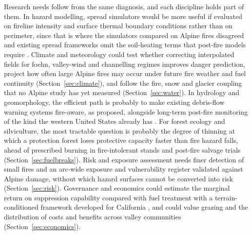 \documentclass[11pt,a4paper]{article}
\begin{document}
Research needs follow from the same diagnosis, and each discipline holds part of them. In hazard modelling, spread simulators would be more useful if evaluated on fireline intensity and surface thermal boundary conditions rather than on perimeter, since that is where the simulators compared on Alpine fires disagreed \citep{malanchini_modeling_2025} and existing spread frameworks omit the soil-heating terms that post-fire models require \citep{or_review_2023}. Climate and meteorology could test whether correcting interpolated fields for foehn, valley-wind and channelling regimes improves danger prediction, project how often large Alpine fires may occur under future fire weather and fuel continuity (Section~\ref{sec:climate}), and follow the fire, snow and glacier coupling that no Alpine study has yet measured (Section~\ref{sec:water}). In hydrology and geomorphology, the efficient path is probably to make existing debris-flow warning systems fire-aware, as \citet{tiranti_wildfires_2021} proposed, alongside long-term post-fire monitoring of the kind the western United States already has \citep{melzner_wildfire-induced_2025}. For forest ecology and silviculture, the most tractable question is probably the degree of thinning at which a protection forest loses protective capacity faster than fire hazard falls, ahead of prescribed burning in fire-intolerant stands and post-fire salvage trials (Section~\ref{sec:fuelbreaks}). Risk and exposure assessment needs finer detection of small fires and an arc-wide exposure and vulnerability register validated against Alpine damage, without which hazard surfaces cannot be converted into risk (Section~\ref{sec:risk}). Governance and economics could estimate the marginal return on suppression capability compared with fuel treatment with a terrain-conditioned framework developed for California \citep{cardil_assessing_2025}, and could value grazing and the distribution of costs and benefits across valley communities (Section~\ref{sec:economics}).
\end{document}
